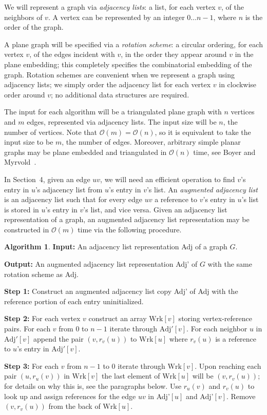 \documentclass[12pt,letterpaper]{article}
\theoremstyle{plain}
\theoremstyle{definition}
\theoremstyle{break}
\newtheorem{algorithm}[lemma]{Algorithm}     %
\newcommand{\defterm}[1]{\emph{#1}} %
\begin{document}
We will represent a graph via \textit{adjacency lists}:
a list, for each vertex $v$, of the neighbors of $v$.
A vertex can be represented by an integer $0\dots n-1$,
where $n$ is the order of the graph.

A plane graph will be specified via
a \defterm{rotation scheme}:
a circular ordering,
for each vertex $v$, of the edges incident with $v$,
in the order they appear around $v$ in the plane embedding;
this completely specifies
the combinatorial embedding of the graph.
Rotation schemes are convenient when we represent a graph
using adjacency lists;
we simply order the adjacency
list for each vertex $v$ in clockwise order around $v$;
no additional data structures are required.

The input for each algorithm
will be a triangulated plane graph with $n$ vertices and $m$ edges, represented
via adjacency lists. The input size will be $n$, the number of vertices. Note
that $\mathcal{O}(m)=\mathcal{O}(n)$, so it is equivalent to take the input size
to be $m$, the number of edges. Moreover, arbitrary simple planar graphs may be
plane embedded and triangulated in $\mathcal{O}(n)$ time, see Boyer and
Myrvold~\cite{BoMy2004}.

In Section~4, given an edge $uv$, we will need an efficient operation to
find $v$'s entry in $u$'s adjacency list from $u$'s entry in $v$'s list.
An \defterm{augmented adjacency list} is an adjacency list such that for
every edge $uv$ a reference to $v$'s entry in
$u$'s list is stored in $u$'s entry in $v$'s list, and vice versa. Given an
adjacency list representation of a graph, an augmented
adjacency list representation may be constructed in $\mathcal{O}(m)$ time via
the following procedure.

\begin{algorithm}\label{A:augment}
\textbf{Input:} An adjacency list representation Adj of a graph $G$.

\noindent\textbf{Output:} An augmented adjacency list representation Adj' of $G$
with the same rotation scheme as Adj.

\noindent\textbf{Step 1:} Construct an augmented adjacency list copy Adj' of Adj
with the reference portion of each entry uninitialized.

\noindent\textbf{Step 2:} For each vertex $v$ construct an array $\text{Wrk}[v]$
storing vertex-reference pairs. For each $v$ from $0$ to $n-1$ iterate through
$\text{Adj}'[v]$. For each neighbor $u$ in $\text{Adj}'[v]$ append the pair $(v,r_v(u))$ to
$\text{Wrk}[u]$ where $r_v(u)$ is a reference to $u$'s entry in $\text{Adj}'[v]$.

\noindent\textbf{Step 3:} For each $v$ from $n-1$ to $0$ iterate through
$\text{Wrk}[v]$. Upon reaching each pair $(u,r_u(v))$ in $\text{Wrk}[v]$ the last element of
$\text{Wrk}[u]$ will be $(v,r_v(u))$; for details on why this is, see the paragraphs
below. Use
$r_u(v)$ and $r_v(u)$ to look up and assign references for the edge $uv$ in
Adj'$[u]$ and Adj'$[v]$. Remove $(v,r_v(u))$ from the back of $\text{Wrk}[u]$.
\end{algorithm}
\end{document}

